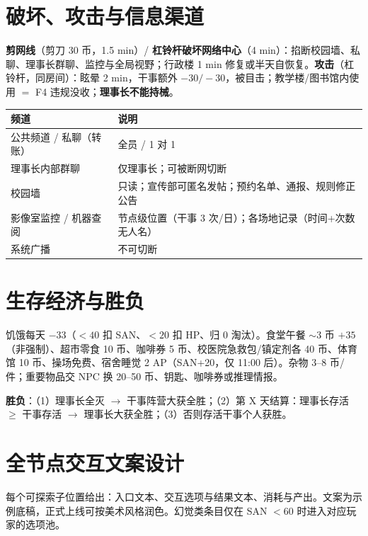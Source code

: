 \documentclass[UTF8, fontset=none, 11pt]{ctexart}
\begin{document}
\section{破坏、攻击与信息渠道}
\textbf{剪网线}（剪刀 30 币，1.5 min）/ \textbf{杠铃杆破坏网络中心}（4 min）：掐断校园墙、私聊、理事长群聊、监控与全局视野；行政楼 1 min 修复或半天自恢复。\textbf{攻击}（杠铃杆，同房间）：眩晕 2 min，干事额外 $-30/-30$，被目击；教学楼/图书馆内使用 $=$ F4 违规没收；\textbf{理事长不能持械}。

\begin{center}
\begin{tabular}{ll}
\toprule
频道 & 说明 \\
\midrule
公共频道 / 私聊（转账） & 全员 / 1 对 1 \\
理事长内部群聊 & 仅理事长；可被断网切断 \\
校园墙 & 只读；宣传部可匿名发帖；预约名单、通报、规则修正公告 \\
影像室监控 / 机器查阅 & 节点级位置（干事 3 次/日）；各场地记录（时间+次数无人名） \\
系统广播 & 不可切断 \\
\bottomrule
\end{tabular}
\end{center}

\section{生存经济与胜负}
饥饿每天 $-33$（$<40$ 扣 SAN、$<20$ 扣 HP、归 0 淘汰）。食堂午餐 $\sim$3 币 $+35$（非强制）、超市零食 10 币、咖啡券 5 币、校医院急救包/镇定剂各 40 币、体育馆 10 币、操场免费、宿舍睡觉 2 AP（SAN+20，仅 11:00 后）。杂物 3--8 币/件；重要物品交 NPC 换 20--50 币、钥匙、咖啡券或推理情报。

\textbf{胜负}：（1）理事长全灭 $\to$ 干事阵营大获全胜；（2）第 X 天结算：理事长存活 $\ge$ 干事存活 $\to$ 理事长大获全胜；（3）否则存活干事个人获胜。

\clearpage
\appendix
\section{全节点交互文案设计}
\label{app:rooms}
每个可探索子位置给出：入口文本、交互选项与结果文本、消耗与产出。文案为示例底稿，正式上线可按美术风格润色。幻觉类条目仅在 SAN $<60$ 时进入对应玩家的选项池。
\end{document}
